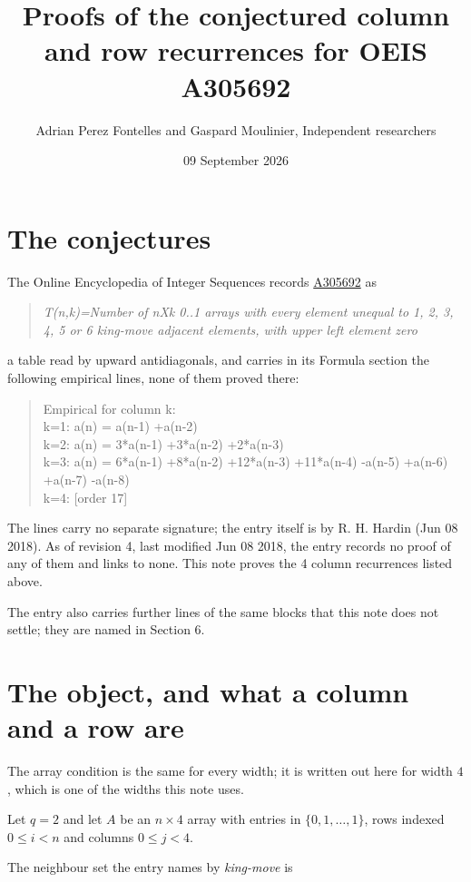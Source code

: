 \documentclass[11pt]{article}
\title{Proofs of the conjectured column and row recurrences for OEIS A305692}
\author{Adrian Perez Fontelles and Gaspard Moulinier, Independent researchers}
\date{09 September 2026}
\theoremstyle{definition}
\begin{document}
\maketitle
\section{The conjectures}

The Online Encyclopedia of Integer Sequences records \href{https://oeis.org/A305692}{A305692} as

\begin{quote}\itshape T(n,k)=Number of nXk 0..1 arrays with every element unequal to 1, 2, 3, 4, 5 or 6 king-move adjacent elements, with upper left element zero\end{quote}

a table read by upward antidiagonals, and carries in its Formula section the following empirical lines, none of them proved there:

\begin{quote}\ttfamily Empirical for column k:\\
k=1: a(n) = a(n-1) +a(n-2)\\k=2: a(n) = 3*a(n-1) +3*a(n-2) +2*a(n-3)\\k=3: a(n) = 6*a(n-1) +8*a(n-2) +12*a(n-3) +11*a(n-4) -a(n-5) +a(n-6) +a(n-7) -a(n-8)\\k=4: [order 17]\end{quote}

The lines carry no separate signature; the entry itself is by R. H. Hardin (Jun 08 2018). As of revision 4, last modified Jun 08 2018, the entry records no proof of any of them and links to none. This note proves the 4 column recurrences listed above.

The entry also carries further lines of the same blocks that this note does not settle; they are named in Section 6.

\section{The object, and what a column and a row are}

The array condition is the same for every width; it is written out here for width $4$, which is one of the widths this note uses.

Let $q = 2$ and let $A$ be an $n \times 4$ array with entries in $\{0,1,\dots,1\}$, rows indexed $0 \le i < n$ and columns $0 \le j < 4$.

The neighbour set the entry names by {\itshape king-move} is
\end{document}
